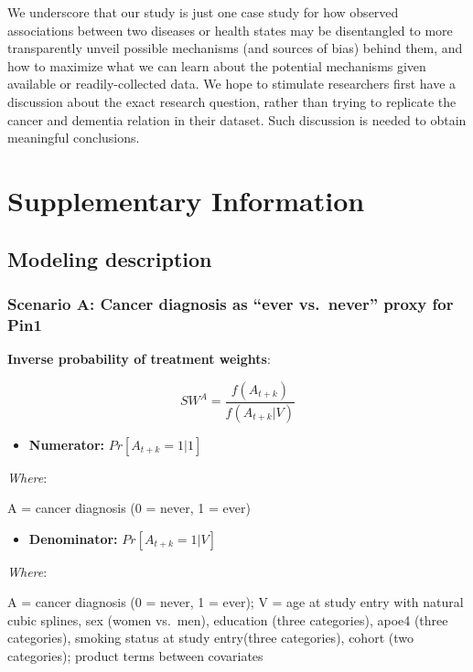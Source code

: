 \documentclass[
]{book}
\providecommand{\tightlist}{%
  \setlength{\itemsep}{0pt}\setlength{\parskip}{0pt}}
\begin{document}
We underscore that our study is just one case study for how observed associations between two diseases or health states may be disentangled to more transparently unveil possible mechanisms (and sources of bias) behind them, and how to maximize what we can learn about the potential mechanisms given available or readily-collected data. We hope to stimulate researchers first have a discussion about the exact research question, rather than trying to replicate the cancer and dementia relation in their dataset. Such discussion is needed to obtain meaningful conclusions.

\newpage

\hypertarget{supplementary-information-2}{%
\section{Supplementary Information}\label{supplementary-information-2}}

\hypertarget{modeling-description}{%
\subsection{Modeling description}\label{modeling-description}}

\hypertarget{scenario-a-cancer-diagnosis-as-ever-vs.-never-proxy-for-pin1}{%
\subsubsection{Scenario A: Cancer diagnosis as ``ever vs.~never'' proxy for Pin1}\label{scenario-a-cancer-diagnosis-as-ever-vs.-never-proxy-for-pin1}}

\textbf{Inverse probability of treatment weights}:

\[SW^A = \frac{f(A_{t+k})}{f(A_{t+k}|V)}\]

\begin{itemize}
\tightlist
\item
  \textbf{Numerator:} \(Pr[A_{t+k} = 1|1]\)
\end{itemize}

\emph{Where}:

A = cancer diagnosis (0 = never, 1 = ever)

\begin{itemize}
\tightlist
\item
  \textbf{Denominator:} \(Pr[A_{t+k} = 1|V]\)
\end{itemize}

\emph{Where}:

A = cancer diagnosis (0 = never, 1 = ever); V = age at study entry with natural cubic splines, sex (women vs.~men), education (three categories), apoe4 (three categories), smoking status at study entry(three categories), cohort (two categories); product terms between covariates
\end{document}
